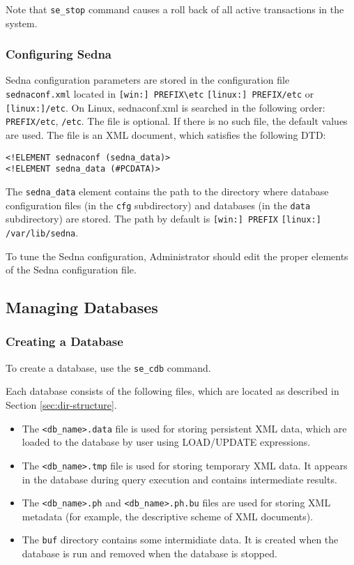 \documentclass[a4paper,12pt]{article}
\begin{document}
Note that \verb!se_stop! command causes a roll back of all active transactions in the system.

\subsubsection{Configuring Sedna}
\label{sec:ConfigSedna}
Sedna configuration parameters are stored in the configuration file \verb!sednaconf.xml! located in
\verb![win:] PREFIX\etc! \verb![linux:] PREFIX/etc! or \verb![linux:]/etc!. On Linux, sednaconf.xml is searched in the following order: \verb!PREFIX/etc!, \verb!/etc!. The file is optional. If there is no such file, the default values are used.
The file is an XML document, which satisfies the following DTD:

\begin{verbatim}
<!ELEMENT sednaconf (sedna_data)>
<!ELEMENT sedna_data (#PCDATA)>
\end{verbatim}

The \verb!sedna_data! element contains the path to the directory where 
database configuration files (in the \verb!cfg! subdirectory) and 
databases (in the \verb!data! subdirectory) are stored. The path by default is
\verb![win:] PREFIX! \verb![linux:] /var/lib/sedna!.
 
To tune the Sedna configuration, Administrator should edit the proper elements of the Sedna configuration file.

\subsection{Managing Databases}
\subsubsection{Creating a Database}
\label{CreateDB}
To create a database, use the \verb!se_cdb! command.

Each database consists of the following files, which are located as described in Section \ref{sec:dir-structure}.

\begin{itemize}
\item The \verb!<db_name>.data! file is used for storing persistent XML data, which are loaded to the database by user using LOAD/UPDATE expressions. 
\item The \verb!<db_name>.tmp! file is used for storing temporary XML data. It appears in the database during query execution and contains intermediate results.
\item The \verb!<db_name>.ph! and \verb!<db_name>.ph.bu! files are used for storing XML metadata (for example, the descriptive scheme of XML documents).
\item The \verb!buf! directory contains some intermidiate data. It is created when the database is run and removed when the database is stopped.
\end{itemize}
\end{document}
